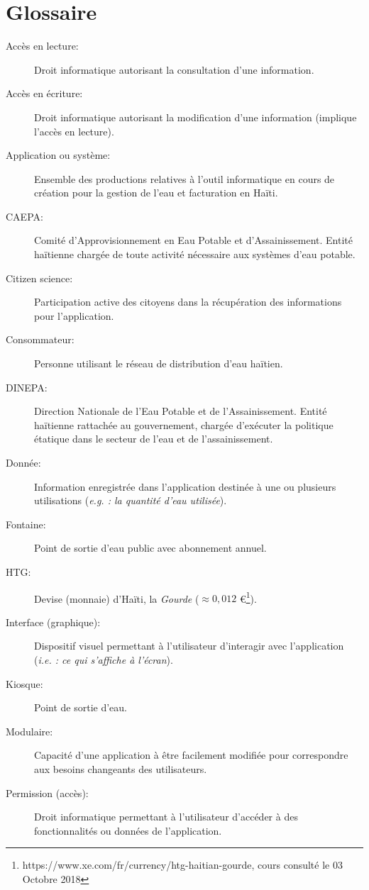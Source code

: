 \documentclass[a4paper, 11pt]{article}
\begin{document}
\section{Glossaire}
  \begin{description}
    \item[Accès en lecture:] Droit informatique autorisant la consultation d'une information.
    \item[Accès en écriture:] Droit informatique autorisant la modification d'une information (implique l'accès en lecture).
    \item[Application ou système:] Ensemble des productions relatives à l'outil informatique en cours de création pour la gestion de l'eau et facturation en Haïti.
    \item[CAEPA:] Comité d'Approvisionnement en Eau Potable et d'Assainissement. Entité haïtienne chargée de toute activité nécessaire aux systèmes d'eau potable.
    \item[Citizen science:] Participation active des citoyens dans la récupération des informations pour l'application.
    \item[Consommateur:] Personne utilisant le réseau de distribution d'eau haïtien.
    \item[DINEPA:] Direction Nationale de l'Eau Potable et de l'Assainissement. Entité haïtienne rattachée au gouvernement, chargée d'exécuter la politique étatique dans le secteur de l'eau et de l'assainissement.
    \item[Donnée:] Information enregistrée dans l'application destinée à une ou plusieurs utilisations (\emph{e.g. : la quantité d'eau utilisée}).
    \item[Fontaine:] Point de sortie d'eau public avec abonnement annuel.
    \item[HTG:] Devise (monnaie) d'Haïti, la \emph{Gourde} ($\approx 0,012$ \euro \footnote{https://www.xe.com/fr/currency/htg-haitian-gourde, cours consulté le 03 Octobre 2018}).
    \item[Interface (graphique):] Dispositif visuel permettant à l'utilisateur d'interagir avec l'application (\emph{i.e. : ce qui s'affiche à l'écran}).
    \item[Kiosque:] Point de sortie d'eau. %
    \item[Modulaire:] Capacité d'une application à être facilement modifiée pour correspondre aux besoins changeants des utilisateurs.
    \item[Permission (accès):] Droit informatique permettant à l'utilisateur d'accéder à des fonctionnalités ou données de l'application.

\end{description}
\end{document}
